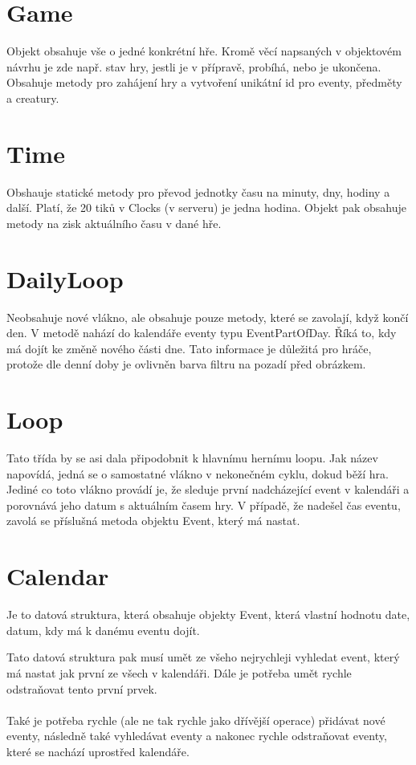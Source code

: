 \documentclass[12pt,a4paper]{report}
\begin{document}
\section{Game}
Objekt obsahuje vše o jedné konkrétní hře. Kromě věcí napsaných v objektovém návrhu je zde např. stav hry, jestli je v přípravě, probíhá, nebo je ukončena. Obsahuje metody pro zahájení hry a vytvoření unikátní id pro eventy, předměty a creatury. 

\section{Time}
Obshauje statické metody pro převod jednotky času na minuty, dny, hodiny a další. Platí, že 20 tiků v Clocks (v serveru) je jedna hodina. Objekt pak obsahuje metody na zisk aktuálního času v dané hře.

\section{DailyLoop}
Neobsahuje nové vlákno, ale obsahuje pouze metody, které se zavolají, když končí den. V metodě nahází do kalendáře eventy typu EventPartOfDay. Říká to, kdy má dojít ke změně nového části dne. Tato informace je důležitá pro hráče, protože dle denní doby je ovlivněn barva filtru na pozadí před obrázkem.

\section{Loop}
Tato třída by se asi dala připodobnit k hlavnímu hernímu loopu. Jak název napovídá, jedná se o samostatné vlákno v nekonečném cyklu, dokud běží hra. Jediné co toto vlákno provádí je, že sleduje první nadcházející event v kalendáři a porovnává jeho datum s aktuálním časem hry. V případě, že nadešel čas eventu, zavolá se příslušná metoda objektu Event, který má nastat.

\section{Calendar}
Je to datová struktura, která obsahuje objekty Event, která vlastní hodnotu date, datum, kdy má k danému eventu dojít. 

Tato datová struktura pak musí umět ze všeho nejrychleji vyhledat event, který má nastat jak první ze všech v kalendáři. Dále je potřeba umět rychle odstraňovat tento první prvek.

\paragraph{}
Také je potřeba rychle (ale ne tak rychle jako dřívější operace) přidávat nové eventy, následně také vyhledávat eventy a nakonec rychle odstraňovat eventy, které se nachází uprostřed kalendáře.
\end{document}
